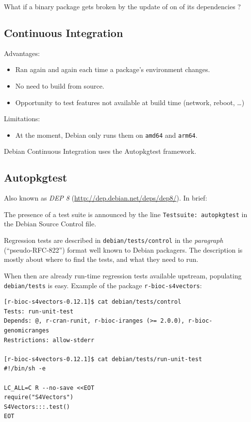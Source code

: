 \documentclass[mingoth,a4paper]{jsarticle}
\providecommand{\tightlist}{%
  \setlength{\itemsep}{0pt}\setlength{\parskip}{0pt}}
\begin{document}
What if a binary package gets broken by the update of on of its
dependencies ?

\subsection{Continuous Integration}\label{continuous-integration}

Advantages:

\begin{itemize}
\tightlist
\item
  Ran again and again each time a package's environment changes.
\item
  No need to build from source.
\item
  Opportunity to test features not available at build time (network,
  reboot, \ldots{})
\end{itemize}

Limitations:

\begin{itemize}
\tightlist
\item
  At the moment, Debian only runs them on \texttt{amd64} and
  \texttt{arm64}.
\end{itemize}

Debian Continuous Integration uses the Autopkgtest framework.

\subsection{Autopkgtest}\label{autopkgtest}

Also known as \emph{DEP 8} (\url{http://dep.debian.net/deps/dep8/}). In
brief:

The presence of a test suite is announced by the line
\texttt{Testsuite:\ autopkgtest} in the Debian Source Control file.

Regression tests are described in \texttt{debian/tests/control} in the
\emph{paragraph} (``pseudo-RFC-822'') format well known to Debian
packagers. The description is mostly about where to find the tests, and
what they need to run.

When then are already run-time regression tests available upstream,
populating \texttt{debian/tests} is easy. Example of the package
\texttt{r-bioc-s4vectors}:

\begin{verbatim}
[r-bioc-s4vectors-0.12.1]$ cat debian/tests/control 
Tests: run-unit-test
Depends: @, r-cran-runit, r-bioc-iranges (>= 2.0.0), r-bioc-genomicranges
Restrictions: allow-stderr

[r-bioc-s4vectors-0.12.1]$ cat debian/tests/run-unit-test 
#!/bin/sh -e

LC_ALL=C R --no-save <<EOT
require("S4Vectors")
S4Vectors:::.test()
EOT
\end{verbatim}
\end{document}
